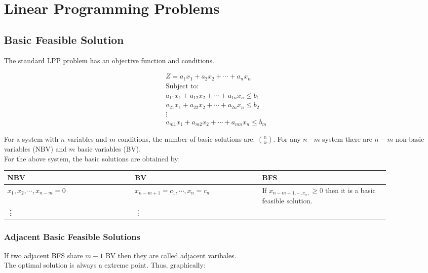 \chapter{Linear Programming Problems}
\section{Basic Feasible Solution}
The standard LPP problem has an objective function and conditions.
\begin{center}
	\begin{align*}
		Z = a_1 x_1 + a_2 x_2 + \cdots + a_n x_n\\
		\text{Subject to:}\\
		a_{11} x_{1} + a_{12} x_{2} + \cdots + a_{1n}x_n \leq b_1\\
		a_{21} x_{1} + a_{22} x_{2} + \cdots + a_{2n}x_n \leq b_2\\
		\vdots\\
		a_{m1} x_{1} + a_{m2} x_{2} + \cdots + a_{mn}x_n \leq b_m
	\end{align*}
\end{center}
For a system with $n$ variables and $m$ conditions, the number of basic solutions are: $\binom{n}{k}$.
For any $n$ - $m$ system there are $n-m$ non-basic variables (NBV) and $m$ basic variables (BV).\\
For the above system, the basic solutions are obtained by:\\
\begin{table}[htbp]
	\centering
	\begin{tabular}{p{0.3\linewidth}  p{0.3\linewidth} p{0.3\linewidth} }
		\toprule
		NBV & BV & BFS\\
		\midrule
		$x_1,x_2,\cdots,x_{n-m} = 0$ & $x_{n-m+1} = c_1, \cdots , x_n = c_n$ & If $x_{n-m+1, \cdots , x_n,} \geq 0$ then it is a basic feasible solution.\\
		\vdots & \vdots & \\
		\bottomrule
	\end{tabular}
\end{table}

\subsection{Adjacent Basic Feasible Solutions}
If two adjacent BFS share $m-1$ BV then they are called adjacent varibales.\\
The optimal solution is always a extreme point. Thus, graphically:

